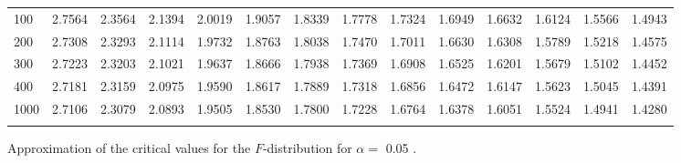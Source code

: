{\begin{tabular}{l|lllllllllllll}
\\ 
100 & 2.7564 & 2.3564 & 2.1394 & 2.0019 & 1.9057 & 1.8339 & 1.7778 & 1.7324 & 1.6949 & 1.6632 & 1.6124 & 1.5566 & 1.4943 \\[5pt] \arrayrulecolor{light-gray}\hline\arrayrulecolor{black}  
200 & 2.7308 & 2.3293 & 2.1114 & 1.9732 & 1.8763 & 1.8038 & 1.7470 & 1.7011 & 1.6630 & 1.6308 & 1.5789 & 1.5218 & 1.4575 \\[5pt] \arrayrulecolor{light-gray}\hline\arrayrulecolor{black}  
300 & 2.7223 & 2.3203 & 2.1021 & 1.9637 & 1.8666 & 1.7938 & 1.7369 & 1.6908 & 1.6525 & 1.6201 & 1.5679 & 1.5102 & 1.4452 \\[5pt] \arrayrulecolor{light-gray}\hline\arrayrulecolor{black}  
400 & 2.7181 & 2.3159 & 2.0975 & 1.9590 & 1.8617 & 1.7889 & 1.7318 & 1.6856 & 1.6472 & 1.6147 & 1.5623 & 1.5045 & 1.4391 \\[5pt] \arrayrulecolor{light-gray}\hline\arrayrulecolor{black}  
1000 & 2.7106 & 2.3079 & 2.0893 & 1.9505 & 1.8530 & 1.7800 & 1.7228 & 1.6764 & 1.6378 & 1.6051 & 1.5524 & 1.4941 & 1.4280 \\[5pt] \arrayrulecolor{light-gray}\hline\arrayrulecolor{black}  
\end{tabular}}
\clearpage

Approximation of the critical values for the $F$-distribution for $\alpha=$ 0.05 . 


